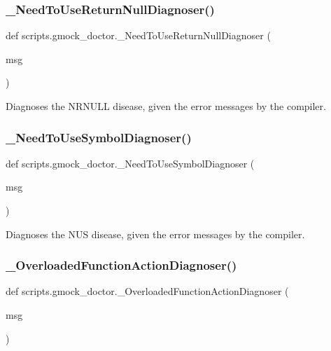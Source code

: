 \subsubsection{\texorpdfstring{\_NeedToUseReturnNullDiagnoser()}{\_NeedToUseReturnNullDiagnoser()}}
{\footnotesize\ttfamily def scripts.\+gmock\+\_\+doctor.\+\_\+\+Need\+To\+Use\+Return\+Null\+Diagnoser (\begin{DoxyParamCaption}\item[{}]{msg }\end{DoxyParamCaption})\hspace{0.3cm}{\ttfamily [private]}}

\begin{DoxyVerb}Diagnoses the NRNULL disease, given the error messages by the compiler.\end{DoxyVerb}
 \mbox{\label{namespacescripts_1_1gmock__doctor_a6c5502e6b1cf3d5f8ca7943c4c82d086}} 
\subsubsection{\texorpdfstring{\_NeedToUseSymbolDiagnoser()}{\_NeedToUseSymbolDiagnoser()}}
{\footnotesize\ttfamily def scripts.\+gmock\+\_\+doctor.\+\_\+\+Need\+To\+Use\+Symbol\+Diagnoser (\begin{DoxyParamCaption}\item[{}]{msg }\end{DoxyParamCaption})\hspace{0.3cm}{\ttfamily [private]}}

\begin{DoxyVerb}Diagnoses the NUS disease, given the error messages by the compiler.\end{DoxyVerb}
 \mbox{\label{namespacescripts_1_1gmock__doctor_aad7e3ce8270d754a0dc380ff4e6dcefe}} 
\subsubsection{\texorpdfstring{\_OverloadedFunctionActionDiagnoser()}{\_OverloadedFunctionActionDiagnoser()}}
{\footnotesize\ttfamily def scripts.\+gmock\+\_\+doctor.\+\_\+\+Overloaded\+Function\+Action\+Diagnoser (\begin{DoxyParamCaption}\item[{}]{msg }\end{DoxyParamCaption})\hspace{0.3cm}{\ttfamily [private]}}

